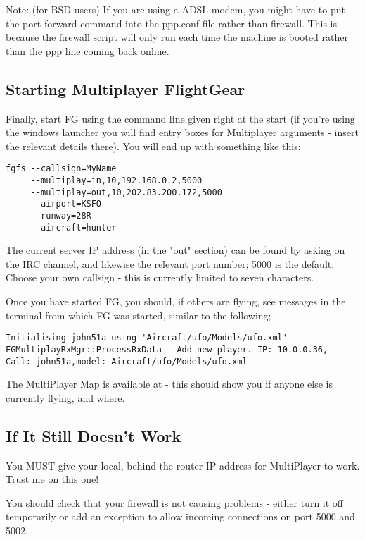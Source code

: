 Note: (for BSD users) If you are using a ADSL modem, you might have to put the port forward command into the ppp.conf file rather than firewall. This is because the firewall script will only run each time the machine is booted rather than the ppp line coming back online.

\subsection{Starting Multiplayer FlightGear}

Finally, start FG using the command line given right at the start (if you're using the windows launcher you will find entry boxes for Multiplayer arguments - insert the relevant details there). You will end up with something like this;

\begin{verbatim}
fgfs --callsign=MyName 
     --multiplay=in,10,192.168.0.2,5000   
     --multiplay=out,10,202.83.200.172,5000 
     --airport=KSFO 
     --runway=28R   
     --aircraft=hunter 
\end{verbatim}

The current server IP address (in the "out" section) can be found by asking on the IRC channel, and likewise the relevant port number; 5000 is the default. Choose your own callsign - this is currently limited to seven characters.

Once you have started FG, you should, if others are flying, see messages in the terminal from which FG was started, similar to the following;

\begin{verbatim}
Initialising john51a using 'Aircraft/ufo/Models/ufo.xml'  
FGMultiplayRxMgr::ProcessRxData - Add new player. IP: 10.0.0.36,  
Call: john51a,model: Aircraft/ufo/Models/ufo.xml 
\end{verbatim}

The MultiPlayer Map is available at  - this should show you if anyone else is currently flying, and where.

\subsection{If It Still Doesn't Work}

You MUST give your local, behind-the-router IP address for MultiPlayer to work. Trust me on this one!

You should check that your firewall is not causing problems - either turn it off temporarily or add an exception to allow incoming connections on port 5000 and 5002.


